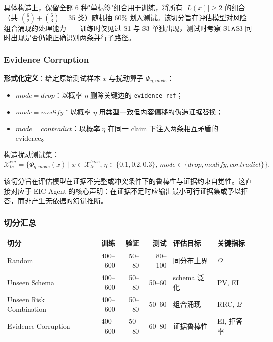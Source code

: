 \documentclass[a4paper,12pt]{ctexart}
\begin{document}
具体构造上，保留全部 6 种"单标签"组合用于训练，将所有 $|L(x)| \ge 2$ 的组合（共 $\binom{6}{2} + \binom{6}{3} = 35$ 类）随机抽 60\% 划入测试。该切分旨在评估模型对风险组合涌现的处理能力——训练时仅见过 S1 与 S3 单独出现，测试时考察 S1∧S3 同时出现是否仍能正确识别两条并行子路径。

\subsubsection{Evidence Corruption}

\textbf{形式化定义}：给定原始测试样本 $x$ 与扰动算子 $\Phi_{\eta, mode}$：

\begin{itemize}[leftmargin=*]
\item $mode = drop$：以概率 $\eta$ 删除关键边的 \texttt{evidence\_ref}；
\item $mode = modify$：以概率 $\eta$ 用类型一致但内容偏移的伪造证据替换；
\item $mode = contradict$：以概率 $\eta$ 在同一 claim 下注入两条相互矛盾的 evidence。
\end{itemize}

构造扰动测试集：
\[\mathcal{X}_{te}^{evi} = \{\Phi_{\eta, mode}(x) \mid x \in \mathcal{X}_{te}^{base},\,\eta \in \{0.1, 0.2, 0.3\},\,mode \in \{drop, modify, contradict\}\}.\]

该切分旨在评估模型在证据不完整或冲突条件下的鲁棒性与证据约束自觉性。这直接对应于 EIC-Agent 的核心声明：在证据不足时应输出最小可行证据集或予以拒答，而非产生无依据的幻觉推断。

\subsubsection{切分汇总}

\begin{table}[htbp]
\centering
\small
\setlength{\tabcolsep}{4pt}
\begin{tabular}{|l|r|r|r|l|l|}
\hline
\textbf{切分} & \textbf{训练} & \textbf{验证} & \textbf{测试} & \textbf{评估目标} & \textbf{关键指标} \\
\hline
Random & 400–600 & 50–80 & 80–100 & 同分布上界 & $\Omega$ \\
\hline
Unseen Schema & 400–600 & 50–80 & 50–60 & schema 泛化 & PV, EI \\
\hline
Unseen Risk Combination & 400–600 & 50–80 & 50–60 & 组合涌现 & RRC, $\Omega$ \\
\hline
Evidence Corruption & 400–600 & 50–80 & 60–80 & 证据鲁棒性 & EI, 拒答率 \\
\hline
\end{tabular}
\end{table}
\end{document}
